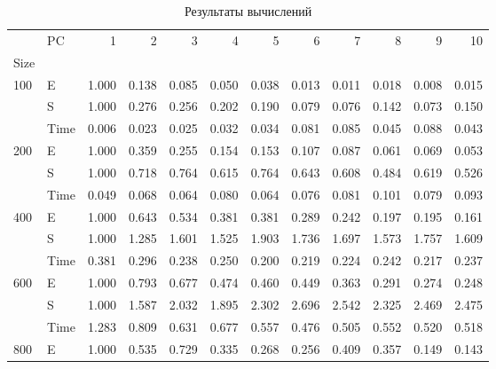 \begin{table}[H]
    \center

    \caption{Результаты вычислений}
    \label{tab:results-all-m}
    \fontsize{11pt}{11pt}\selectfont
    \begin{tabular}{|l|l|rrrrrrrrrr|}
        \hline
        & PC   & 1      & 2      & 3      & 4      & 5      & 6      & 7      & 8     & 9     & 10    \\
        Size                     &      &        &        &        &        &        &        &        &       &       &       \\
        \hline
        \multirow[t]{3}{*}{100}  & E    & 1.000  & 0.138  & 0.085  & 0.050  & 0.038  & 0.013  & 0.011  & 0.018 & 0.008 & 0.015 \\
        & S    & 1.000  & 0.276  & 0.256  & 0.202  & 0.190  & 0.079  & 0.076  & 0.142 & 0.073 & 0.150 \\
        & Time & 0.006  & 0.023  & 0.025  & 0.032  & 0.034  & 0.081  & 0.085  & 0.045 & 0.088 & 0.043 \\
        \cline{1-12}
        \multirow[t]{3}{*}{200}  & E    & 1.000  & 0.359  & 0.255  & 0.154  & 0.153  & 0.107  & 0.087  & 0.061 & 0.069 & 0.053 \\
        & S    & 1.000  & 0.718  & 0.764  & 0.615  & 0.764  & 0.643  & 0.608  & 0.484 & 0.619 & 0.526 \\
        & Time & 0.049  & 0.068  & 0.064  & 0.080  & 0.064  & 0.076  & 0.081  & 0.101 & 0.079 & 0.093 \\
        \cline{1-12}
        \multirow[t]{3}{*}{400}  & E    & 1.000  & 0.643  & 0.534  & 0.381  & 0.381  & 0.289  & 0.242  & 0.197 & 0.195 & 0.161 \\
        & S    & 1.000  & 1.285  & 1.601  & 1.525  & 1.903  & 1.736  & 1.697  & 1.573 & 1.757 & 1.609 \\
        & Time & 0.381  & 0.296  & 0.238  & 0.250  & 0.200  & 0.219  & 0.224  & 0.242 & 0.217 & 0.237 \\
        \cline{1-12}
        \multirow[t]{3}{*}{600}  & E    & 1.000  & 0.793  & 0.677  & 0.474  & 0.460  & 0.449  & 0.363  & 0.291 & 0.274 & 0.248 \\
        & S    & 1.000  & 1.587  & 2.032  & 1.895  & 2.302  & 2.696  & 2.542  & 2.325 & 2.469 & 2.475 \\
        & Time & 1.283  & 0.809  & 0.631  & 0.677  & 0.557  & 0.476  & 0.505  & 0.552 & 0.520 & 0.518 \\
        \cline{1-12}
        \multirow[t]{3}{*}{800}  & E    & 1.000  & 0.535  & 0.729  & 0.335  & 0.268  & 0.256  & 0.409  & 0.357 & 0.149 & 0.143 \\

\end{tabular}
\end{table}
